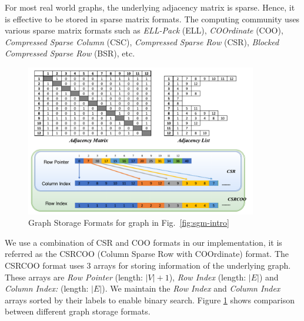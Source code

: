 For most real world graphs, the underlying adjacency matrix is sparse. Hence, it is effective to be stored in sparse matrix formats.
The computing community uses various sparse matrix formats such as \textit{ELL-Pack} (ELL), \textit{COOrdinate} (COO), \textit{Compressed Sparse Column} (CSC), \textit{Compressed Sparse Row} (CSR), \textit{Blocked Compressed Sparse Row} (BSR), etc.


\begin{figure}[h]
    \includegraphics[width=0.9\textwidth]{fig/graph-storage.png}
    \caption{Graph Storage Formats for graph in Fig.\ \ref{fig:sgm-intro}}
    \label{fig:graph-storage}
\end{figure}

We use a combination of CSR and COO formats in our implementation, it is referred as the CSRCOO (Column Sparse Row with COOrdinate) format.
The CSRCOO format uses 3 arrays for storing information of the underlying graph.
These arrays are \textit{Row Pointer} (length: $|V|+1$), \textit{Row Index} (length: $|E|$) and \textit{Column Index:} (length: $|E|$).
We maintain the \textit{Row Index} and \textit{Column Index} arrays sorted by their labels to enable binary search.
Figure \ref{fig:graph-storage} shows comparison between different graph storage formats.
